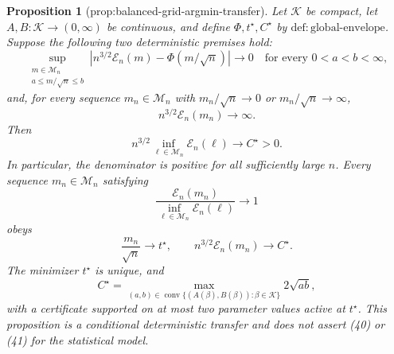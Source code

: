 \documentclass{article}
\newtheorem{proposition}{Proposition}
\begin{document}
\begin{proposition}[prop:balanced-grid-argmin-transfer]\label{prop:balanced-grid-argmin-transfer}
Let \(\mathcal K\) be compact, let \(A,B:\mathcal K\to(0,\infty)\) be continuous, and define \(\Phi,t^\star,C^\star\) by \(\mathrm{def{:}global\text{-}envelope}\).  Suppose the following two deterministic premises hold:
\[
\sup_{\substack{m\in\mathcal M_n\\ a\leq m/\sqrt n\leq b}}
\left|n^{3/2}\mathcal E_n(m)-\Phi(m/\sqrt n)\right|
\longrightarrow0
\quad\text{for every }0<a<b<\infty,
\tag{40}
\]
and, for every sequence \(m_n\in\mathcal M_n\) with
\(m_n/\sqrt n\to0\) or \(m_n/\sqrt n\to\infty\),
\[
n^{3/2}\mathcal E_n(m_n)\longrightarrow\infty.
\tag{41}
\]
Then
\[
n^{3/2}\inf_{\ell\in\mathcal M_n}\mathcal E_n(\ell)\longrightarrow C^\star>0.
\]
In particular, the denominator is positive for all sufficiently large \(n\).  Every sequence \(m_n\in\mathcal M_n\) satisfying
\[
\frac{\mathcal E_n(m_n)}
{\inf_{\ell\in\mathcal M_n}\mathcal E_n(\ell)}
\longrightarrow1
\]
obeys
\[
\frac{m_n}{\sqrt n}\longrightarrow t^\star,
\qquad
n^{3/2}\mathcal E_n(m_n)\longrightarrow C^\star.
\]
The minimizer \(t^\star\) is unique, and
\[
C^\star
=\max_{(a,b)\in\operatorname{conv}
\{(A(\beta),B(\beta)):\beta\in\mathcal K\}}
2\sqrt{ab},
\]
with a certificate supported on at most two parameter values active at \(t^\star\).  This proposition is a conditional deterministic transfer and does not assert (40) or (41) for the statistical model.
\end{proposition}
\end{document}
